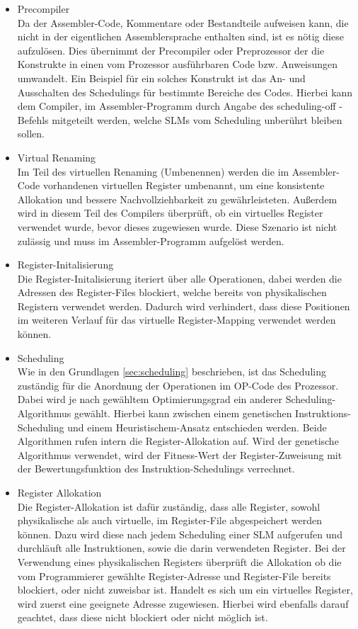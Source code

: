 \begin{itemize}
	\item Precompiler\\
		Da der Assembler-Code, Kommentare oder Bestandteile aufweisen kann, die nicht in der eigentlichen Assemblersprache enthalten sind, ist es nötig diese aufzulösen. Dies übernimmt der Precompiler oder Preprozessor der die Konstrukte in einen vom Prozessor ausführbaren Code bzw. Anweisungen umwandelt. Ein Beispiel für ein solches Konstrukt ist das An- und Ausschalten des Schedulings für bestimmte Bereiche des Codes. Hierbei kann dem Compiler, im Assembler-Programm durch Angabe des \glqq scheduling-off \grqq-Befehls mitgeteilt werden, welche SLMs vom Scheduling unberührt bleiben sollen.
	\item Virtual Renaming\\
		Im Teil des virtuellen Renaming (Umbenennen) werden die im Assembler-Code vorhandenen virtuellen Register umbenannt, um eine konsistente Allokation und bessere Nachvollziehbarkeit zu gewährleisteten. Außerdem wird in diesem Teil des Compilers überprüft, ob ein virtuelles Register verwendet wurde, bevor dieses zugewiesen wurde. Diese Szenario ist nicht zulässig und muss im Assembler-Programm aufgelöst werden.
	\item Register-Initalisierung\\
		Die Register-Initalisierung iteriert über alle Operationen, dabei werden die Adressen des Register-Files blockiert, welche bereits von physikalischen Registern verwendet werden. Dadurch wird verhindert, dass diese Positionen im weiteren Verlauf für das virtuelle Register-Mapping verwendet werden können.
	\item Scheduling\\
		Wie in den Grundlagen \ref{sec:scheduling} beschrieben, ist das Scheduling zuständig für die Anordnung der Operationen im OP-Code des Prozessor. Dabei wird je nach gewähltem Optimierungsgrad ein anderer Scheduling-Algorithmus gewählt. Hierbei kann zwischen einem genetischen Instruktions-Scheduling und einem Heuristischem-Ansatz entschieden werden. Beide Algorithmen rufen intern die Register-Allokation auf. Wird der genetische Algorithmus verwendet, wird der Fitness-Wert der Register-Zuweisung mit der Bewertungsfunktion des Instruktion-Schedulings verrechnet.
	\item Register Allokation\\
		Die Register-Allokation ist dafür zuständig, dass alle Register, sowohl physikalische als auch virtuelle, im Register-File abgespeichert werden können. Dazu wird diese nach jedem Scheduling einer SLM aufgerufen und durchläuft alle Instruktionen, sowie die darin verwendeten Register. Bei der Verwendung eines physikalischen Registers überprüft die Allokation ob die vom Programmierer gewählte Register-Adresse und Register-File bereits blockiert, oder nicht zuweisbar ist. Handelt es sich um ein virtuelles Register, wird zuerst eine geeignete Adresse zugewiesen. Hierbei wird ebenfalls darauf geachtet, dass diese nicht blockiert oder nicht möglich ist.

\end{itemize}
